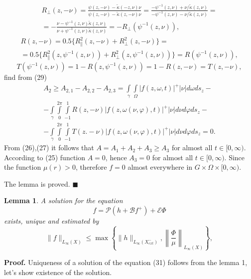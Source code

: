\documentclass[12pt,reqno]{report}
\newtheorem{lemma}{Lemma}
\begin{document}
\begin{multline}
R_{\bot}(z,-\nu)=\frac{\psi(z,-\nu)-\widetilde{\kappa}(-z,\nu)\nu}
{\psi(z,-\nu)-\widetilde{\kappa}(z,-\nu)\nu}= \frac{-
	\psi^{-1}(z,\nu)+\nu/\widetilde{\kappa}(z,\nu)}{-
	\psi^{-1}(z,\nu)-\nu/\widetilde{\kappa}(z,\nu)}= \\ = -\frac{ \nu -
	\psi^{-1}(z,\nu)\widetilde{\kappa}(z,\nu)}{\nu+
	\psi^{-1}(z,\nu)\widetilde{\kappa}(z,\nu)} =-R_{\bot}(\psi^{-1}(z,\nu)), \nonumber
\end{multline}
\begin{multline}
R(z,-\nu)=0.5\{R^2_{\|}(z,-\nu) +R^2_{\bot}(z,-\nu)\}= \\=
0.5\{R^2_{\|}(z,\psi^{-1}(z,\nu)) +R^2_{\bot}(z,\psi^{-1}(z,\nu))\}=
R(\psi^{-1}(z,\nu)), \nonumber
\end{multline}
$$
T(\psi^{-1}(z,\nu))=1-R(z,\psi^{-1}(z,\nu))=1-R(z,-\nu)=T(z,-\nu),
$$
find from (29)
\begin{multline}
A_2 \geq  A_{2,1}- A_{2,2} - A_{2,3}=  \int \limits_{\gamma} \int \limits_{\Omega}| f
(z,\omega,t)|^+|\nu | d\omega d s_z - 
\\-
\int \limits_{\gamma} \int
\limits^{2\pi}_{0} \int \limits^{1}_{-1} R(z,-\nu)
|f(z,\omega(\nu,\varphi),t)|^+ |\nu| d \nu d \varphi  d s_z - \\-
\int \limits_{\gamma}
\int
\limits^{2\pi}_{0} \int \limits^{1}_{-1} 
T(z.-\nu) |f(z,\omega(\nu,\varphi),t)|^+ |\nu| d \nu d
\varphi  d s_z=0.
\end{multline}
From (26),(27) it follows that $A=A_1+A_2+A_3 \geq A_3$ for almost all
$t\in [0,\infty)$. According to (25) function $A=0$, hence
$A_3=0$ for almost all $t\in [0,\infty)$. Since the function $\mu(r) > 0$,
therefore $f=0$ almost everywhere in $G \times \Omega \times
[0,\infty)$. 


The lemma is proved. 
$\blacksquare$


\begin{lemma}
	A solution for the equation
	\begin{equation}
	f= \mathcal P (h+\mathcal B f^+) + \mathcal E \Phi
	\end{equation}
	exists, unique and estimated by
	\begin{equation}
	\|f\|_{L_{\infty}(X)} \leq \max \left \{ \| h \|_{L_{\infty}(X^-_{ext})}, \left
	\|\frac{\Phi}{\mu} \right\|_{L_{\infty}(X)}\right\},
	\end{equation}
\end{lemma}
{\bf Proof.} Uniqueness of a solution of the equation (31)
follows from the lemma 1, let's show existence of the solution.
\end{document}
